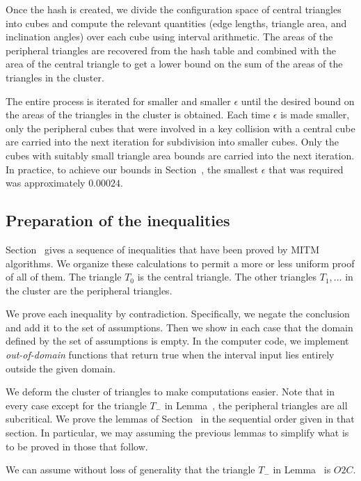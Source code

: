 Once the hash is created, we divide the configuration space of central
triangles into cubes and compute the relevant quantities (edge
lengths, triangle area, and inclination angles) over each cube using
interval arithmetic.  The areas of the peripheral triangles are
recovered from the hash table and combined with the area of the
central triangle to get a lower bound on the sum of the areas of the
triangles in the cluster.

The entire process is iterated for smaller and smaller $\epsilon$
until the desired bound on the areas of the triangles in the cluster
is obtained.  Each time $\epsilon$ is made smaller, only the
peripheral cubes that were involved in a key collision with a central
cube are carried into the next iteration for subdivision into smaller
cubes.  Only the cubes with suitably small triangle area bounds are
carried into the next iteration.  In practice, to achieve our bounds
in Section~, the smallest $\epsilon$ that was required
was approximately $0.00024$.

\subsection{Preparation of the inequalities}\label{sec:calc-prep}

Section~ gives a sequence of inequalities that have been
proved by MITM algorithms.  We organize these calculations to permit a
more or less uniform proof of all of them.  The triangle $T_0$ is  the
central triangle.  The other triangles $T_1,\ldots$ in the cluster are the
peripheral triangles.

We prove each inequality by contradiction. Specifically, we negate the
conclusion and add it to the set of assumptions.  Then we show in each
case that the domain defined by the set of assumptions is empty. In
the computer code, we implement {\it out-of-domain} functions that
return true when the interval input lies entirely outside the given
domain.

We deform the cluster of triangles to make computations easier.  Note
that in every case except for the triangle $T_-$ in
Lemma~, the peripheral triangles are all
subcritical.  We prove the lemmas of Section~ in the
sequential order given in that section.  In particular, we may
assuming the previous lemmas to simplify what is to be proved in those
that follow.

\begin{lemma}  
  We can assume without loss of generality that the triangle $T_-$ in
  Lemma~ is $O2C$.
\end{lemma}

